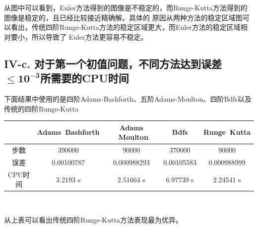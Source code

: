 \documentclass[twoside,a4paper]{article}
\begin{document}
\raggedright
\hspace{0.8em}
从图中可以看到，Euler方法得到的图像是不稳定的，而Runge-Kutta方法得到的图像是稳定的，且已经比较接近精确解。具体的
原因从两种方法的稳定区域图可以看出，传统四阶Runge-Kutta方法的稳定区域更大，而Euler方法的稳定区域相对要小，所以导致了
Euler方法更容易不稳定。

\subsection*{IV-c. 对于第一个初值问题，不同方法达到误差$\mathbf{\leq10^{-3}}$所需要的CPU时间}
\hspace{0.8em}
下面结果中使用的是四阶Adams-Bashforth、五阶Adams-Moulton、四阶Bdfs以及传统的四阶Runge-Kutta
\\[12pt]
\centering
\renewcommand{\arraystretch}{2}
\begin{tabular}{|c|c|c|c|c|}
    \hline
            & \textbf{Adams}\ \textbf{Bashforth} & \textbf{Adams} \ \textbf{Moulton} & \textbf{Bdfs} & \textbf{Runge}\ \textbf{Kutta} \\
    \hline
    步数    & 390000                             & 90000                             & 370000        & 90000                          \\
    \hline
    误差    & 0.00100787                         & 0.000988293                       & 0.00105583    & 0.000988999                    \\
    \hline
    CPU时间 & 3.2193 s                           & 2.51664 s                         & 6.97739 s     & 2.24541 s                      \\
    \hline
\end{tabular}
\\[12pt]
\raggedright
从上表可以看出传统四阶Runge-Kutta方法表现最为优异。
\end{document}
